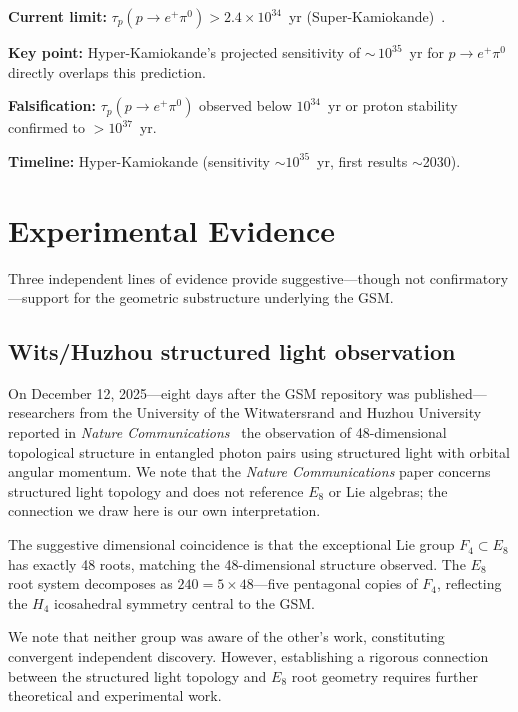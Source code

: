 \documentclass[aps,prd,twocolumn,superscriptaddress,nofootinbib,showpacs]{revtex4-2}
\begin{document}
\textbf{Current limit:} $\tau_p(p \to e^+\pi^0) > 2.4 \times
10^{34}$~yr (Super-Kamiokande)~\cite{SuperK}.

\textbf{Key point:} Hyper-Kamiokande's projected sensitivity of
${\sim}\,10^{35}$~yr for $p \to e^+\pi^0$ directly overlaps this
prediction.

\textbf{Falsification:} $\tau_p(p \to e^+\pi^0)$ observed below
$10^{34}$~yr or proton stability confirmed to ${>}10^{37}$~yr.

\textbf{Timeline:} Hyper-Kamiokande (sensitivity $\sim\!10^{35}$~yr,
first results $\sim$2030).

\section{Experimental Evidence}\label{sec:evidence}

Three independent lines of evidence provide suggestive---though not
confirmatory---support for the geometric substructure underlying the
GSM.

\subsection{Wits/Huzhou structured light observation}\label{sec:wits}

On December 12, 2025---eight days after the GSM repository was
published---researchers from the University of the Witwatersrand and
Huzhou University reported in \textit{Nature
Communications}~\cite{WitsHuzhou2025} the observation of
48-dimensional topological structure in entangled photon pairs using
structured light with orbital angular momentum.  We note that the
\textit{Nature Communications} paper concerns structured light
topology and does not reference $E_8$ or Lie algebras; the connection
we draw here is our own interpretation.

The suggestive dimensional coincidence is that the exceptional Lie
group $F_4 \subset E_8$ has exactly 48 roots, matching the
48-dimensional structure observed.  The $E_8$ root system decomposes
as $240 = 5 \times 48$---five pentagonal copies of $F_4$, reflecting
the $H_4$ icosahedral symmetry central to the GSM.

We note that neither group was aware of the other's work,
constituting convergent independent discovery.  However, establishing
a rigorous connection between the structured light topology and $E_8$
root geometry requires further theoretical and experimental work.
\end{document}
